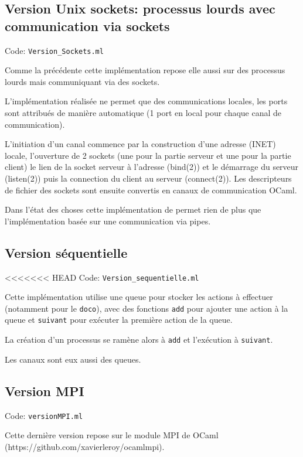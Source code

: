 \documentclass[a4paper]{article}
\begin{document}
\subsection{Version Unix sockets: processus lourds avec communication via sockets}

Code: \verb|Version_Sockets.ml|

Comme la précédente cette implémentation repose elle aussi sur des processus lourds mais communiquant via des sockets.

L'implémentation réalisée ne permet que des communications locales, les ports sont attribués de manière automatique (1 port en local pour chaque canal de communication).

L'initiation d'un canal commence par la construction d'une adresse (INET) locale, l'ouverture de 2 sockets (une pour la partie serveur et une pour la partie client) le lien de la socket serveur à l'adresse (bind(2)) et le démarrage du serveur (listen(2)) puis la connection du client au serveur (connect(2)). Les descripteurs de fichier des sockets sont ensuite convertis en canaux de communication OCaml.

Dans l'état des choses cette implémentation de permet rien de plus que l'implémentation basée sur une communication via pipes.

\subsection{Version séquentielle}

<<<<<<< HEAD
Code: \verb|Version_sequentielle.ml|

Cette implémentation utilise une queue pour stocker les actions à effectuer (notamment pour le \texttt{doco}), avec des fonctions \texttt{add} pour ajouter une action à la queue et \texttt{suivant} pour exécuter la première action de la queue.

La création d'un processus se ramène alors à \texttt{add} et l'exécution à \texttt{suivant}.

Les canaux sont eux aussi des queues. 

\subsection{Version MPI}

Code: \verb|versionMPI.ml|

Cette dernière version repose sur le module MPI de OCaml (https://github.com/xavierleroy/ocamlmpi).
\end{document}
